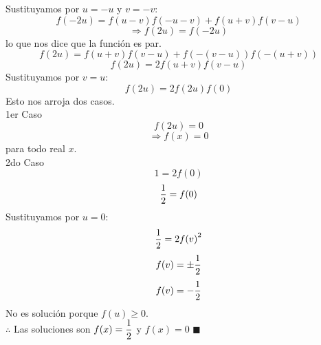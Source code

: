 \documentclass{book}
\begin{document}
\begin{enumerate}
        Sustituyamos por $u=-u$ y $v=-v$:
        $$f(-2u)=f(u-v)f(-u-v)+ f(u + v)f(v - u)$$
        $$\Rightarrow f(2u)=f(-2u)$$
        lo que nos dice que la función es par.
        $$f(2u) = f(u + v)f(v -u) + f(-(v-u))f(-(u+v))$$
        $$f(2u) = 2f(u + v)f(v -u)$$
        Sustituyamos por $v=u$:
        $$f(2u) = 2f(2u)f(0)$$
        Esto nos arroja dos casos.\\
        1er Caso
        $$f(2u) =0$$
        $$\Rightarrow f(x)=0$$
        para todo real $x$.\\
        2do Caso
        $$1 = 2f(0)$$
        $${1\over 2}  = f(0)$$
        Sustituyamos por $u=0$:
        $${1\over 2}= 2{f(v)}^2$$
        $$f(v)=\pm{1\over 2}$$
        $$f(v)=-{1\over 2}$$
        No es solución porque $f(u)\geq  0$.\\
        $\therefore$ Las soluciones son $\displaystyle{f(x)={1\over 2}}$ y $f(x)=0$ $\blacksquare$\\


\end{enumerate}
\end{document}
